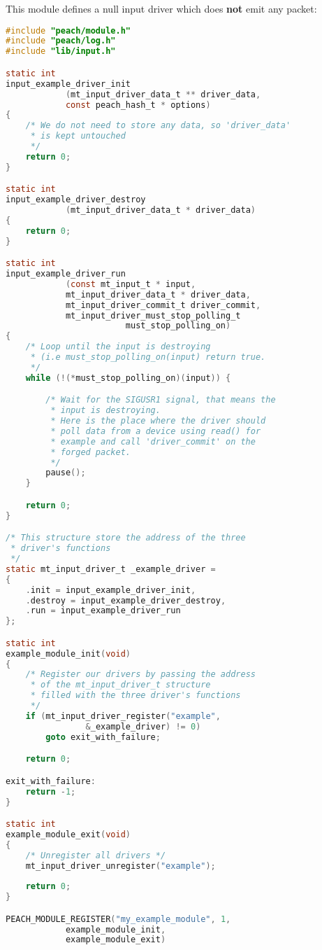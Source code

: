 This module defines a null input driver which does \textbf{not} emit any packet:
\begin{lstlisting}[language=C,
caption=Complete Input \& Module example]
#include "peach/module.h"
#include "peach/log.h"
#include "lib/input.h"

static int 
input_example_driver_init
            (mt_input_driver_data_t ** driver_data, 
            const peach_hash_t * options)
{
    /* We do not need to store any data, so 'driver_data'
     * is kept untouched
     */
    return 0;
}

static int 
input_example_driver_destroy
            (mt_input_driver_data_t * driver_data)
{
    return 0;
}

static int
input_example_driver_run
            (const mt_input_t * input,
            mt_input_driver_data_t * driver_data,
            mt_input_driver_commit_t driver_commit,
            mt_input_driver_must_stop_polling_t 
                        must_stop_polling_on)
{
    /* Loop until the input is destroying 
     * (i.e must_stop_polling_on(input) return true.
     */
    while (!(*must_stop_polling_on)(input)) {

        /* Wait for the SIGUSR1 signal, that means the 
         * input is destroying.
         * Here is the place where the driver should 
         * poll data from a device using read() for 
         * example and call 'driver_commit' on the 
         * forged packet.
         */
        pause();
    }

    return 0;
}

/* This structure store the address of the three
 * driver's functions
 */
static mt_input_driver_t _example_driver =
{
    .init = input_example_driver_init,
    .destroy = input_example_driver_destroy,
    .run = input_example_driver_run
};

static int
example_module_init(void)
{
    /* Register our drivers by passing the address
     * of the mt_input_driver_t structure
     * filled with the three driver's functions 
     */
    if (mt_input_driver_register("example", 
                &_example_driver) != 0) 
        goto exit_with_failure;

    return 0;

exit_with_failure:
    return -1;
}

static int
example_module_exit(void)
{
    /* Unregister all drivers */
    mt_input_driver_unregister("example");
    
    return 0;
}

PEACH_MODULE_REGISTER("my_example_module", 1,
            example_module_init,
            example_module_exit)

\end{lstlisting}
